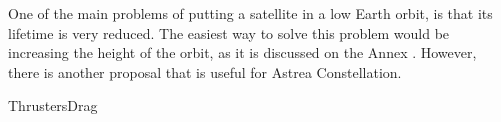 
One of the main problems of putting a satellite in a low Earth orbit, is that its lifetime is very reduced. The easiest way to solve this problem would be increasing the height of the orbit, as it is discussed on the Annex \cite[Chapter 4, Section 4]{annex1}. However, there is another proposal that is useful for Astrea Constellation.

{ThrustersDrag}